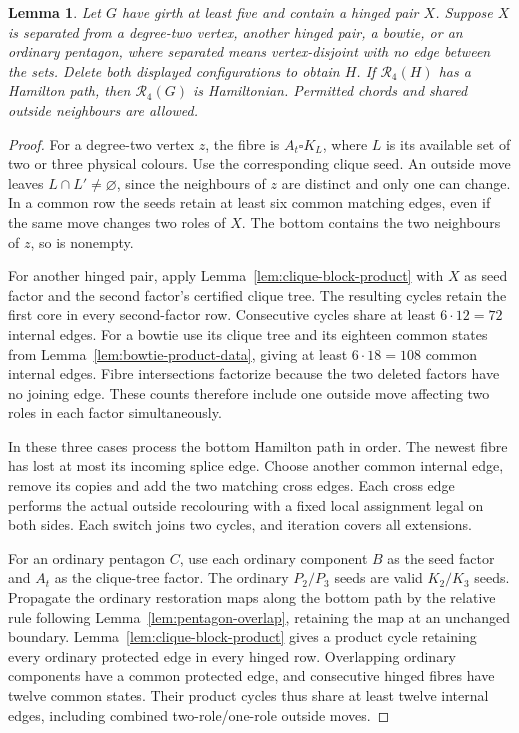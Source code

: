 \documentclass[11pt]{article}
\newtheorem{lemma}[theorem]{Lemma}
\theoremstyle{remark}
\newcommand{\R}{\mathcal R}
\numberwithin{equation}{section}
\numberwithin{table}{section}
\begin{document}
\begin{lemma}\label{lem:hinged-restorations}
Let $G$ have girth at least five and contain a hinged pair $X$.
Suppose $X$ is separated from a degree-two vertex, another hinged
pair, a bowtie, or an ordinary pentagon, where separated means
vertex-disjoint with no edge between the sets. Delete both displayed
configurations to obtain $H$. If $\R_4(H)$ has a Hamilton path,
then $\R_4(G)$ is Hamiltonian. Permitted chords and shared outside
neighbours are allowed.
\end{lemma}
\begin{proof}
For a degree-two vertex $z$, the fibre is $A_t\square K_L$, where
$L$ is its available set of two or three physical colours. Use the
corresponding clique seed. An outside move leaves $L\cap L'\ne
\varnothing$, since the neighbours of $z$ are distinct and only one
can change. In a common row the seeds retain at least six common
matching edges, even if the same move changes two roles of $X$.
The bottom contains the two neighbours of $z$, so is nonempty.

For another hinged pair, apply Lemma~\ref{lem:clique-block-product}
with $X$ as seed factor and the second factor's certified clique tree.
The resulting cycles retain the first core in every second-factor row.
Consecutive cycles share at least $6\cdot12=72$ internal edges.
For a bowtie use its clique tree and its eighteen common states from
Lemma~\ref{lem:bowtie-product-data}, giving at least $6\cdot18=108$
common internal edges. Fibre intersections factorize because the two
deleted factors have no joining edge. These counts therefore include
one outside move affecting two roles in each factor simultaneously.

In these three cases process the bottom Hamilton path in order.
The newest fibre has lost at most its incoming splice edge. Choose
another common internal edge, remove its copies and add the two
matching cross edges. Each cross edge performs the actual outside
recolouring with a fixed local assignment legal on both sides. Each
switch joins two cycles, and iteration covers all extensions.

For an ordinary pentagon $C$, use each ordinary component $B$ as the
seed factor and $A_t$ as the clique-tree factor. The ordinary
$P_2/P_3$ seeds are valid $K_2/K_3$ seeds. Propagate the ordinary
restoration maps along the bottom path by the relative rule following
Lemma~\ref{lem:pentagon-overlap}, retaining the map at an unchanged
boundary. Lemma~\ref{lem:clique-block-product} gives a product cycle
retaining every ordinary protected edge in every hinged row.
Overlapping ordinary components have a common protected edge, and
consecutive hinged fibres have twelve common states. Their product
cycles thus share at least twelve internal edges, including combined
two-role/one-role outside moves.


\end{proof}
\end{document}
